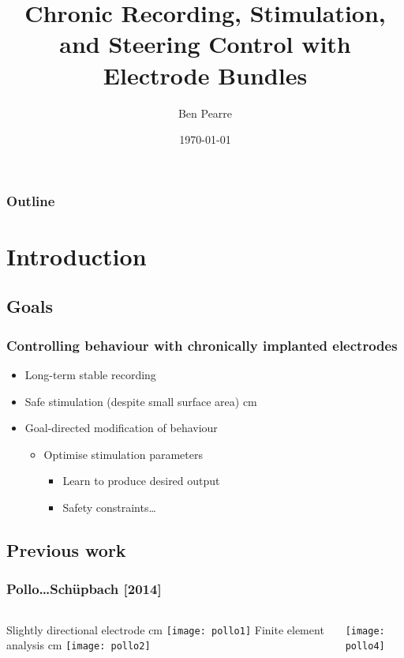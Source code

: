 \documentclass{beamer}
\title[Chronic Electrode Bundles]{Chronic Recording, Stimulation, and Steering Control with Electrode Bundles}
\author{Ben Pearre}
\date{\today}
\begin{document}
\begin{frame}
  \titlepage
\end{frame}

\begin{frame}
  \frametitle{Outline}
  \tableofcontents
\end{frame}




\section{Introduction}
\subsection{Goals}

\begin{frame}
  \frametitle{Controlling behaviour with chronically implanted electrodes}
  \begin{itemize}
  \item Long-term stable recording
  \item Safe stimulation (despite small surface area)
     cm
  \item Goal-directed modification of behaviour
    \begin{itemize}
    \item Optimise stimulation parameters
      \begin{itemize}
      \item Learn to produce desired output
      \item Safety constraints\dots
      \end{itemize}
    \end{itemize}
  \end{itemize}
\end{frame}


\subsection{Previous work}

\begin{frame}
  \frametitle{Pollo\dots Sch\"upbach [2014]}
  \begin{columns}
    \column{5cm}
    Slightly directional electrode
     cm
    \texttt{[image: pollo1]}
    \column{5cm}
    Finite element analysis
     cm
    \texttt{[image: pollo2]}
    
    \texttt{[image: pollo4]}
  \end{columns}
\end{frame}
\end{document}

